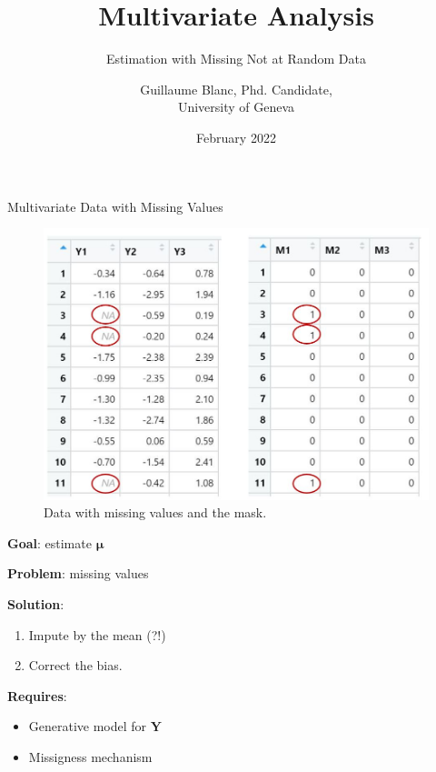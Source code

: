 \documentclass[aspectratio=169,xcolor=dvipsnames]{beamer}
\title[short title]{Multivariate Analysis}
\subtitle{Estimation with Missing Not at Random Data}
\author[GB] {Guillaume Blanc, Phd. Candidate, \\ University of Geneva}
\date{{\large February 2022}} %
\begin{document}
\begin{frame}
    \titlepage
\end{frame}


\begin{frame}{Multivariate Data with Missing Values}
    \noindent\begin{minipage}[t]{0.65\linewidth}
    \begin{figure}
        \centering
        \includegraphics[width=.85\textwidth]{images/missin_ex.JPG}
        \caption{Data with missing values and the mask.}
    \end{figure}
    \end{minipage}
    \noindent\begin{minipage}[t]{0.33\linewidth}
        \fontsize{11pt}{15}\selectfont
        \vspace{.3cm}
        \noindent
        \textbf{Goal}: estimate $\bm\mu$

        \noindent
        \textbf{Problem}: missing values

        \vspace{1cm}
        \noindent
        \textbf{Solution}: 
        \begin{enumerate}
            \item Impute by the mean (?!)
            \item Correct the bias.
        \end{enumerate}

        \noindent
        \textbf{Requires}:
        \begin{itemize}%
            \item Generative model for $\bm Y$
            \item Missigness mechanism
        \end{itemize}
    \end{minipage}
\end{frame}
\end{document}
